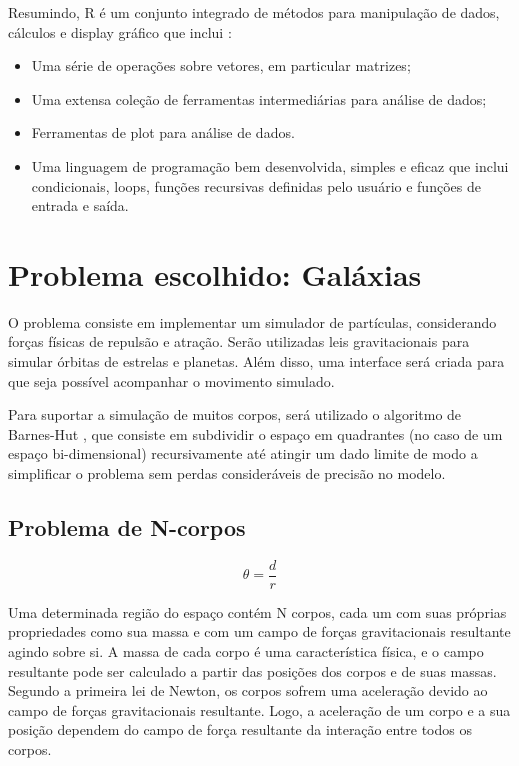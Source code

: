 \documentclass[rel_mlp]{iiufrgs}
\begin{document}
	Resumindo, R é um conjunto integrado de métodos para manipulação de dados, cálculos e display gráfico que inclui \cite{linguagemR}:
\begin{itemize}
\item Uma série de operações sobre vetores, em particular matrizes;
\item Uma extensa coleção de ferramentas intermediárias para análise de dados;
\item Ferramentas de plot para análise de dados.
\item Uma linguagem de programação bem desenvolvida, simples e eficaz que inclui condicionais, loops, funções recursivas definidas pelo usuário e funções de entrada e saída.
\end{itemize}

\section{Problema escolhido: Galáxias}

	O problema consiste em implementar um simulador de partículas, considerando forças físicas de repulsão e atração. Serão utilizadas leis gravitacionais para simular órbitas de estrelas e planetas. Além disso, uma interface será criada para que seja possível acompanhar o movimento simulado.

    Para suportar a simulação de muitos corpos, será utilizado o algoritmo de Barnes-Hut \cite{Barnes}, que consiste em subdividir o espaço em quadrantes (no caso de um espaço bi-dimensional) recursivamente até atingir um dado limite de modo a simplificar o problema sem perdas consideráveis de precisão no modelo.

\subsection{Problema de N-corpos}

\begin{equation}
\label{theta}
\theta=\frac{d}{r}
\end{equation}

Uma determinada região do espaço contém N corpos, cada um com suas próprias propriedades como sua massa e com um campo de forças gravitacionais resultante agindo sobre si. A massa de cada corpo é uma característica física, e o campo resultante pode ser calculado a partir das posições dos corpos e de suas massas. Segundo a primeira lei de Newton, os corpos sofrem uma aceleração devido ao campo de forças gravitacionais resultante. Logo, a aceleração de um corpo e a sua posição dependem do campo de força resultante da interação entre todos os corpos.
\end{document}
